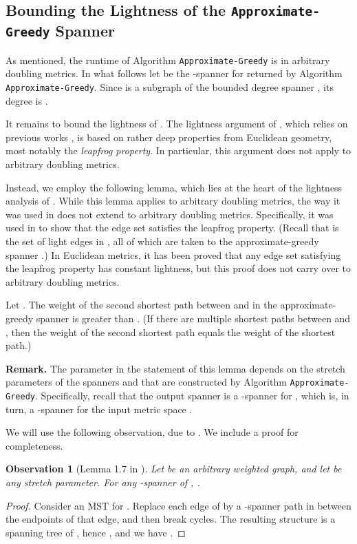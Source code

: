 \documentclass[11pt,letterpaper]{article}
\newtheorem{observation}[lemma]{Observation}
\begin{document}
\subsection{Bounding the Lightness of the  \texttt{Approximate-Greedy} Spanner} \label{bounding}
As mentioned, the runtime of Algorithm \texttt{Approximate-Greedy} is   in arbitrary doubling metrics.
In what follows let  be the -spanner for   returned by Algorithm \texttt{Approximate-Greedy}.
Since  is a subgraph of the bounded degree spanner , its degree is .

It remains to bound the lightness of .
The lightness argument of \cite{GLN02}, which relies on previous works \cite{DHN93,DN97},
is based on rather deep properties from Euclidean geometry, most notably the \emph{leapfrog property}.
In particular, this argument does not apply to arbitrary doubling metrics.

Instead, we employ the following lemma, which lies at the heart of the lightness analysis of \cite{GLN02}.
While this lemma applies to arbitrary doubling metrics, the way it was used in \cite{GLN02} does not extend to arbitrary doubling metrics.
Specifically, it was used in \cite{GLN02} to show that the edge set  satisfies the leapfrog property.
(Recall that  is the set of light edges in , all of which are taken to the approximate-greedy spanner .)
In Euclidean metrics, it has been proved \cite{DHN93,NS07} that any edge set satisfying the leapfrog property has constant lightness, but this proof does not carry over to arbitrary doubling metrics.
\begin{lemma}\label{lem:GLN_second_path}
	Let . The weight of the second shortest path between  and  in the approximate-greedy spanner  is greater than .
	(If there are multiple shortest paths between  and , then the weight of the second shortest path equals the weight of the shortest path.)
\end{lemma}
\noindent
{\bf Remark.} The parameter  in the statement of this lemma depends on the stretch parameters of the spanners  and 
that are constructed by Algorithm \texttt{Approximate-Greedy}.
Specifically, recall that the output spanner  is a -spanner for ,
which is, in turn, a -spanner for the input metric space .

We will use the following observation, due to \cite{Smid07}. We include a proof for completeness.
\begin{observation} [Lemma 1.7 in \cite{Smid07}] \label{mstsimple2}
	Let  be an arbitrary weighted graph, and let  be any stretch parameter.
	For any -spanner  of , .
\end{observation}
\begin{proof}
	Consider an MST  for .
	Replace each edge of  by a -spanner path in  between the endpoints of that edge, and then break cycles.
	The resulting structure  is a spanning tree of , hence , and we have
	.
\end{proof}
\end{document}
